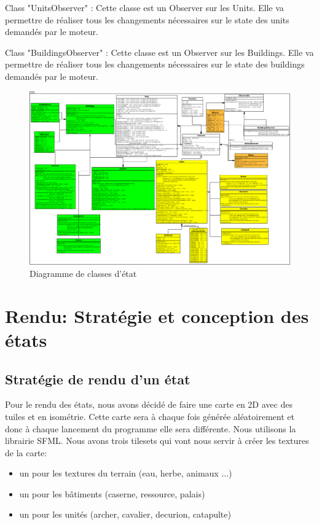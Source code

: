 \documentclass[12pt,a4paper]{article}
\begin{document}
Class "UnitsObserver" : Cette classe est un Observer sur les Units. Elle va permettre de réaliser tous les changements nécessaires sur le state des units demandés par le moteur.

Class "BuildingsObserver" : Cette classe est un Observer sur les Buildings. Elle va permettre de réaliser tous les changements nécessaires sur le state des buildings demandés par le moteur.

\begin{figure}[!ht]
\centering
    \includegraphics[width=1\textwidth]{ressources/state.png}
     \caption{Diagramme de classes d'état}
\end{figure}

\newpage
\section{Rendu: Stratégie et conception des états}
\subsection{Stratégie de rendu d'un état}

Pour le rendu des états, nous avons décidé de faire une carte en 2D avec des tuiles et en isométrie. Cette carte sera à chaque fois générée aléatoirement et donc à chaque lancement du programme elle sera différente. Nous utilisons la librairie SFML. Nous avons trois tilesets qui vont nous servir à créer les textures de la carte: 
\begin{itemize}
\item un pour les textures du terrain (eau, herbe, animaux ...)
\item un pour les bâtiments (caserne, ressource, palais)
\item un pour les unités (archer, cavalier, decurion, catapulte)
\end{itemize}\\
\end{document}
